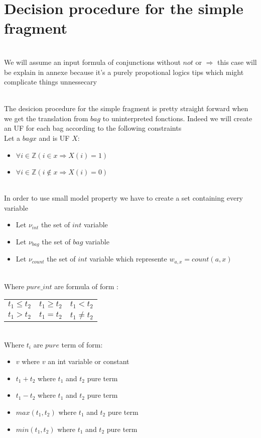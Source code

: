 
\section{Decision procedure for the simple fragment}
\label{sec:fsimple}

\\We will assume an input formula of conjunctions without $not$ or $\Rightarrow$ this case will be explain in 
annexe because it's a purely propotional logics tips which might complicate things unnessecary

\\The desicion procedure for the simple fragment is pretty straight forward when
we get the translation from $bag$ to uninterpreted fonctions.
Indeed we will create an UF for each bag according to the following constraints
\\Let a $bag x$ and is UF $X$:
\begin{itemize}
\renewcommand{\labelitemi}{-}
\setlength{\itemsep}{0cm}%
\setlength{\parskip}{0cm}%
\item $\forall i \in \mathbb{Z} ( i \in x \Rightarrow X(i) = 1)$
\item $\forall i \in \mathbb{Z} ( i \notin x \Rightarrow X(i) = 0)$
\end{itemize}

\\In order to use small model property we have to create a set containing every variable
\begin{itemize}
\renewcommand{\labelitemi}{-}
\setlength{\itemsep}{0cm}%
\setlength{\parskip}{0cm}%
\item Let $\nu_{int}$ the set of $int$ variable 
\item Let $\nu_{bag}$ the set of $bag$ variable
\item Let $\nu_{count}$ the set of $int$ variable which represente $w_{a,x} = count(a,x)$
\end{itemize}

\\Where $pure\_int$ are formula of form :
\begin{tabular}{lcr}
$t_{1} \leq t_{2}$ & $t_{1} \geq t_{2}$ & $t_{1} < t_{2}$ \\
$t_{1} > t_{2}$ & $t_{1} = t_{2}$ & $t_{1} \neq t_{2}$ \\
\end{tabular}

\\Where $t_{i}$ are $pure$ term of form:
\begin{itemize}
\renewcommand{\labelitemi}{-}
\setlength{\itemsep}{0cm}%
\setlength{\parskip}{0cm}%
\item  $v$ where $v$ an int variable or constant
\item  $t_{1} + t_{2}$ where $t_{1}$ and $t_{2}$ pure term
\item  $t_{1} - t_{2}$ where $t_{1}$ and $t_{2}$ pure term
\item  $max(t_{1},t_{2})$ where $t_{1}$ and $t_{2}$ pure term
\item  $min(t_{1},t_{2})$ where $t_{1}$ and $t_{2}$ pure term
\end{itemize}



